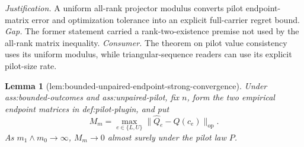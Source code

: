 \documentclass{article}
\newtheorem{lemma}{Lemma}
\begin{document}
\par\smallskip\noindent \textit{Justification.} A uniform all-rank projector modulus converts pilot endpoint-matrix error and optimization tolerance into an explicit full-carrier regret bound. \textit{Gap.} The former statement carried a rank-two-existence premise not used by the all-rank matrix inequality. \textit{Consumer.} The theorem on pilot value consistency uses its uniform modulus, while triangular-sequence readers can use its explicit pilot-size rate.

\begin{lemma}[lem:bounded-unpaired-endpoint-strong-convergence]\label{lem:bounded-unpaired-endpoint-strong-convergence}
Under ass:bounded-outcomes and ass:unpaired-pilot, fix \(n\), form the two empirical endpoint matrices in def:pilot-plugin, and put
\[
 M_m=\max_{e\in\{L,U\}}
 \lVert \widehat Q_e-Q(c_e)\rVert_{\mathrm{op}}.
\]
As \(m_1\wedge m_0\to\infty\), \(M_m\to0\) almost surely under the pilot law \(P\).
\end{lemma}
\end{document}
